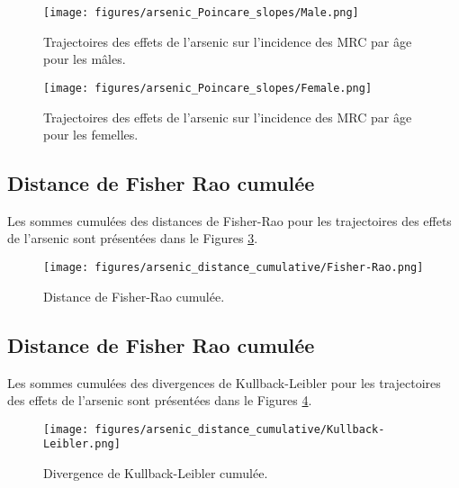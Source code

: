 \begin{figure}[H]
\centering
\texttt{[image: figures/arsenic\_Poincare\_slopes/Male.png]}
\caption{Trajectoires des effets de l'arsenic sur l'incidence des MRC par âge pour les mâles.}
\label{fig:trajectoires-arsenic-males}
\end{figure}

\begin{figure}[H]
	\centering
	\texttt{[image: figures/arsenic\_Poincare\_slopes/Female.png]}
	\caption{Trajectoires des effets de l'arsenic sur l'incidence des MRC par âge pour les femelles.}
	\label{fig:trajectoires-arsenic-females}
\end{figure}

\subsection{Distance de Fisher Rao cumulée}

Les sommes cumulées des distances de Fisher-Rao pour les trajectoires des effets de l'arsenic sont présentées dans le Figures \ref{fig:arsenic_distance_cumulative:Fisher-Rao}.

\begin{figure}[H]
	\centering
	\texttt{[image: figures/arsenic\_distance\_cumulative/Fisher-Rao.png]}
	\caption{Distance de Fisher-Rao cumulée.}
	\label{fig:arsenic_distance_cumulative:Fisher-Rao}
\end{figure}

\subsection{Distance de Fisher Rao cumulée}

Les sommes cumulées des divergences de Kullback-Leibler pour les trajectoires des effets de l'arsenic sont présentées dans le Figures \ref{fig:arsenic_distance_cumulative:Kullback-Leibler}.

\begin{figure}[H]
	\centering
	\texttt{[image: figures/arsenic\_distance\_cumulative/Kullback-Leibler.png]}
	\caption{Divergence de Kullback-Leibler cumulée.}
	\label{fig:arsenic_distance_cumulative:Kullback-Leibler}
\end{figure}